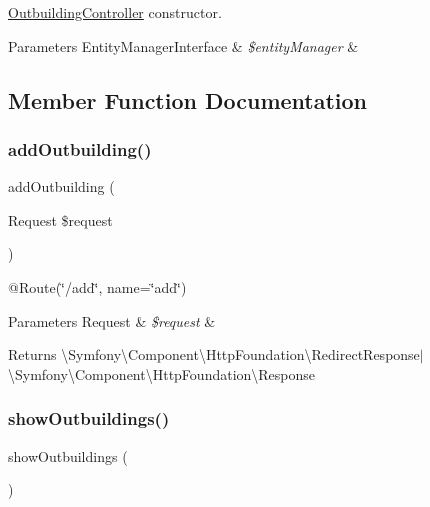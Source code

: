 \mbox{\hyperlink{class_app_1_1_controller_1_1_outbuilding_controller}{Outbuilding\+Controller}} constructor. 
\begin{DoxyParams}[1]{Parameters}
Entity\+Manager\+Interface & {\em \$entity\+Manager} & \\
\hline
\end{DoxyParams}


\subsection{Member Function Documentation}
\mbox{\label{class_app_1_1_controller_1_1_outbuilding_controller_a5e190c2093a15324887095142f1bde4e}} 
\subsubsection{\texorpdfstring{addOutbuilding()}{addOutbuilding()}}
{\footnotesize\ttfamily add\+Outbuilding (\begin{DoxyParamCaption}\item[{Request}]{\$request }\end{DoxyParamCaption})}

@\+Route(\char`\"{}/add\char`\"{}, name=\char`\"{}add\char`\"{}) 
\begin{DoxyParams}[1]{Parameters}
Request & {\em \$request} & \\
\hline
\end{DoxyParams}
\begin{DoxyReturn}{Returns}
\textbackslash{}\+Symfony\textbackslash{}\+Component\textbackslash{}\+Http\+Foundation\textbackslash{}\+Redirect\+Response$\vert$\textbackslash{}\+Symfony\textbackslash{}\+Component\textbackslash{}\+Http\+Foundation\textbackslash{}\+Response 
\end{DoxyReturn}
\mbox{\label{class_app_1_1_controller_1_1_outbuilding_controller_a7c8cb25e70d8480ab028228b93a780df}} 
\subsubsection{\texorpdfstring{showOutbuildings()}{showOutbuildings()}}
{\footnotesize\ttfamily show\+Outbuildings (\begin{DoxyParamCaption}{ }\end{DoxyParamCaption})}

